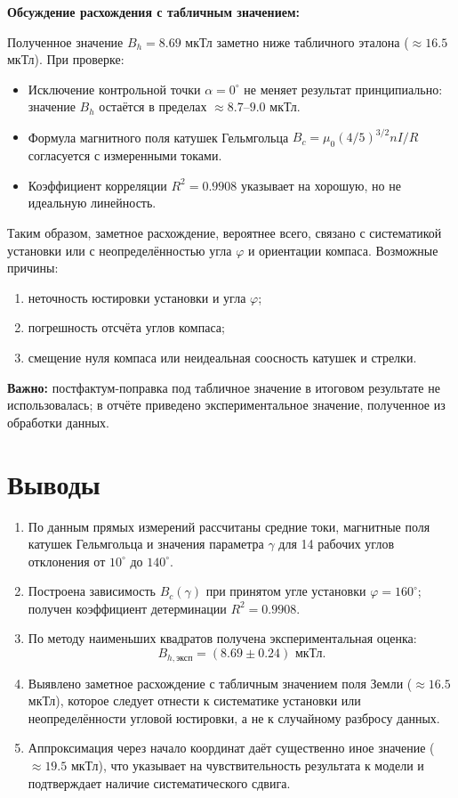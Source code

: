 \documentclass[a4paper,14pt]{extarticle}
\begin{document}
\noindent\textbf{Обсуждение расхождения с табличным значением:}

Полученное значение $B_h = 8.69$ мкТл заметно ниже табличного эталона ($\approx 16.5$ мкТл). При проверке:
\begin{itemize}
    \item Исключение контрольной точки $\alpha=0^\circ$ не меняет результат принципиально: значение $B_h$ остаётся в пределах $\approx 8.7\text{--}9.0$ мкТл.
    \item Формула магнитного поля катушек Гельмгольца $B_c = \mu_0 (4/5)^{3/2} nI/R$ согласуется с измеренными токами.
    \item Коэффициент корреляции $R^2=0.9908$ указывает на хорошую, но не идеальную линейность.
\end{itemize}

Таким образом, заметное расхождение, вероятнее всего, связано с систематикой установки или с неопределённостью угла $\varphi$ и ориентации компаса. Возможные причины:
\begin{enumerate}
    \item неточность юстировки установки и угла $\varphi$;
    \item погрешность отсчёта углов компаса;
    \item смещение нуля компаса или неидеальная соосность катушек и стрелки.
\end{enumerate}

\noindent\textbf{Важно:} постфактум-поправка под табличное значение в итоговом результате не использовалась; в отчёте приведено экспериментальное значение, полученное из обработки данных.

\section{Выводы}

\begin{enumerate}
    \item По данным прямых измерений рассчитаны средние токи, магнитные поля катушек Гельмгольца и значения параметра $\gamma$ для 14 рабочих углов отклонения от $10^\circ$ до $140^\circ$.

    \item Построена зависимость $B_c(\gamma)$ при принятом угле установки $\varphi=160^\circ$; получен коэффициент детерминации $R^2=0.9908$.

    \item По методу наименьших квадратов получена экспериментальная оценка:
    \[
    B_{h,\text{эксп}} = (8.69 \pm 0.24)\text{ мкТл}.
    \]

    \item Выявлено заметное расхождение с табличным значением поля Земли ($\approx 16.5$ мкТл), которое следует отнести к систематике установки или неопределённости угловой юстировки, а не к случайному разбросу данных.

    \item Аппроксимация через начало координат даёт существенно иное значение ($\approx 19.5$ мкТл), что указывает на чувствительность результата к модели и подтверждает наличие систематического сдвига.
\end{enumerate}
\end{document}
